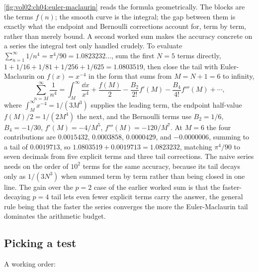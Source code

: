 

\autoref{fig:vol02:ch04:euler-maclaurin} reads the formula
geometrically. The blocks are the terms $f(n)$; the smooth curve is the
integral; the gap between them is exactly what the endpoint and
Bernoulli corrections account for, term by term, rather than merely
bound. A second worked sum makes the accuracy concrete on a series the
integral test only handled crudely. To evaluate $\sum_{n=1}^{\infty}
1/n^{4} = \pi^{4}/90 = 1.0823232\ldots$, sum the first $N = 5$ terms
directly, $1 + 1/16 + 1/81 + 1/256 + 1/625 = 1.0803519$, then close the
tail with Euler-Maclaurin on $f(x) = x^{-4}$ in the form that sums from
$M = N+1 = 6$ to infinity,
\[
\sum_{n=M}^{\infty} \frac{1}{n^{4}} = \int_{M}^{\infty} \frac{\dd x}
{x^{4}} + \frac{f(M)}{2} - \frac{B_{2}}{2!} f'(M) - \frac{B_{4}}{4!}
f'''(M) + \cdots,
\]
where $\int_{M}^{\infty} x^{-4} = 1/(3 M^{3})$ supplies the leading
term, the endpoint half-value $f(M)/2 = 1/(2 M^{4})$ the next, and the
Bernoulli terms use $B_{2} = 1/6$, $B_{4} = -1/30$, $f'(M) = -4/M^{5}$,
$f'''(M) = -120/M^{7}$. At $M = 6$ the four contributions are
$0.0015432$, $0.0003858$, $0.0000429$, and $-0.0000006$, summing to a
tail of $0.0019713$, so $1.0803519 + 0.0019713 = 1.0823232$, matching
$\pi^{4}/90$ to seven decimals from five explicit terms and three tail
corrections. The naive series needs on the order of $10^{2}$ terms for
the same accuracy, because its tail decays only as $1/(3 N^{3})$ when
summed term by term rather than being closed in one line. The gain over
the $p = 2$ case of the earlier worked sum is that the faster-decaying
$p = 4$ tail lets even fewer explicit terms carry the answer, the general
rule being that the faster the series converges the more the
Euler-Maclaurin tail dominates the arithmetic budget.

\subsection{Picking a test}

A working order:

